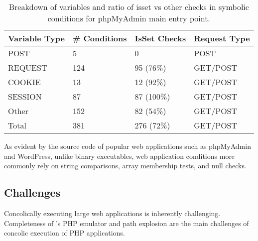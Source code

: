\begin{table}[]
    \centering
    \caption{Breakdown of variables and ratio of isset vs other checks in symbolic conditions for phpMyAdmin main entry point.}
    \label{tab:symbolicvars}
    \begin{tabular}{|l|l|l|l|}
    \hline
    \textbf{Variable Type} & \textbf{\# Conditions} & \textbf{IsSet Checks} & \textbf{Request Type} \\ \hline
    POST                   & 5                      & 0                     & POST                  \\ \hline
    REQUEST                & 124                    & 95 (76\%)             & GET/POST              \\ \hline
    COOKIE                 & 13                     & 12 (92\%)             & GET/POST              \\ \hline
    SESSION                & 87                     & 87 (100\%)            & GET/POST              \\ \hline
    Other                  & 152                    & 82 (54\%)             & GET/POST              \\ \hline
    Total                  & 381                    & 276 (72\%)            & GET/POST                      \\ \hline
    \end{tabular}
    \end{table}

As evident by the source code of popular web applications such as phpMyAdmin and WordPress, unlike binary executables, web application conditions more commonly rely on string comparisons, array membership tests, and null checks. 


\subsection{Challenges}
Concolically executing large web applications is inherently challenging. 
Completeness of \animatedead{}'s PHP emulator and path explosion are the main challenges of concolic execution of PHP applications. 

